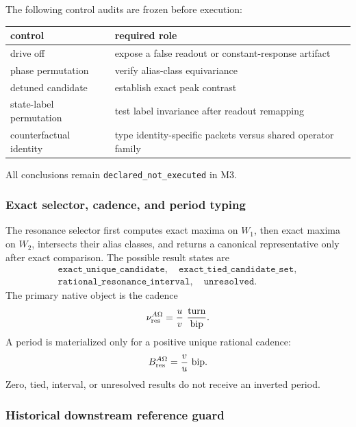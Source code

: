 The following control audits are frozen before execution:
\begin{center}
\begin{tabular}{@{}ll@{}}
\toprule
control & required role\\
\midrule
drive off & expose a false readout or constant-response artifact\\
phase permutation & verify alias-class equivariance\\
detuned candidate & establish exact peak contrast\\
state-label permutation & test label invariance after readout remapping\\
counterfactual identity & type identity-specific packets versus shared operator family\\
\bottomrule
\end{tabular}
\end{center}
All conclusions remain \texttt{declared\_not\_executed} in M3.

\subsubsection{Exact selector, cadence, and period typing}

The resonance selector first computes exact maxima on $W_1$, then exact maxima
on $W_2$, intersects their alias classes, and returns a canonical representative
only after exact comparison.  The possible result states are
\[
\begin{gathered}
\texttt{exact\_unique\_candidate},
\quad
\texttt{exact\_tied\_candidate\_set},\\
\texttt{rational\_resonance\_interval},
\quad
\texttt{unresolved}.
\end{gathered}
\]
The primary native object is the cadence
\[
\nu_{\rm res}^{A\Omega}
=
\frac{u}{v}\ \frac{\text{turn}}{\text{bip}}.
\]
A period is materialized only for a positive unique rational cadence:
\[
B_{\rm res}^{A\Omega}
=
\frac{v}{u}\ \mathrm{bip}.
\]
Zero, tied, interval, or unresolved results do not receive an inverted period.

\subsubsection{Historical downstream reference guard}

